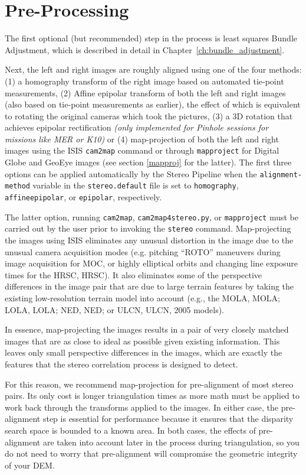 \section{Pre-Processing}

The first optional (but recommended) step in the process is least
squares Bundle Adjustment, which is described in detail in
Chapter~\ref{ch:bundle_adjustment}.

Next, the left and right images are roughly aligned using one of the four
methods: (1) a homography transform of the right image based on
automated tie-point measurements, (2) Affine epipolar transform of both
the left and right images (also based on tie-point measurements as earlier),
the effect of which is equivalent to rotating
the original cameras which took the pictures, (3) a 3D rotation that achieves
epipolar rectification {\it(only implemented for Pinhole sessions for
  missions like MER or K10)} or (4) map-projection of both the left
and right images using the \ac{ISIS} \texttt{cam2map} command or
through \texttt{mapproject} for Digital Globe and GeoEye images (see
section \ref{mapproj} for the latter).
The first three options can be applied automatically by the Stereo
Pipeline when the \texttt{alignment-method} variable in the
\texttt{stereo.default} file is set to \texttt{homography}, 
\texttt{affineepipolar}, or \texttt{epipolar}, respectively.

The latter option, running {\tt cam2map}, {\tt cam2map4stereo.py}, or
{\tt mapproject} must be carried out by the user prior to
invoking the {\tt stereo} command.  Map-projecting the images using
\ac{ISIS} eliminates any unusual distortion in the image due to the
unusual camera acquisition modes (e.g. pitching ``ROTO'' maneuvers
during image acquisition for \ac{MOC}, or highly elliptical orbits and
changing line exposure times for the \acl{HRSC}, \acs{HRSC}).  It also
eliminates some of the perspective differences in the image pair that
are due to large terrain features by taking the existing low-resolution
terrain model into account (e.g., the \acl{MOLA}, \acs{MOLA};
\acl{LOLA}, \acs{LOLA}; \acl {NED}, \acs {NED}; or \acl{ULCN},
\acs{ULCN}, 2005 models).

In essence, map-projecting the images results in a pair of very
closely matched images that are as close to ideal as possible given
existing information. This leaves only small perspective differences
in the images, which are exactly the features that the stereo
correlation process is designed to detect.

For this reason, we recommend map-projection for pre-alignment of most
stereo pairs. Its only cost is longer triangulation times as more math
must be applied to work back through the transforms applied to the images. In
either case, the pre-alignment step is essential for performance
because it ensures that the disparity search space is bounded to a
known area.  In both cases, the effects of pre-alignment are taken
into account later in the process during triangulation, so you do not
need to worry that pre-alignment will compromise the geometric
integrity of your \ac{DEM}.

